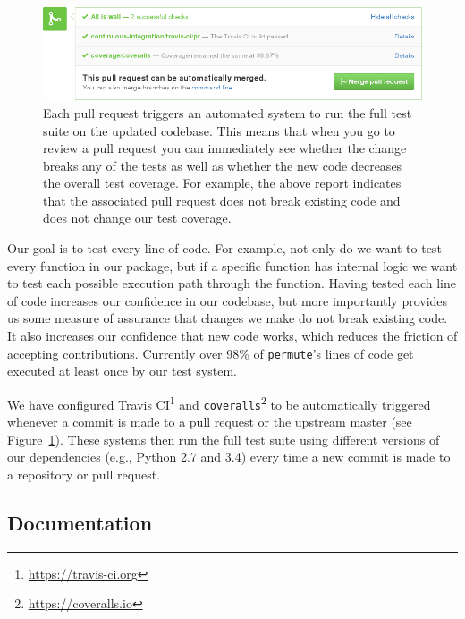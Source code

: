 \documentclass[]{article}
\begin{document}
\begin{figure}
  \begin{centering}
    \includegraphics[width=\textwidth]{pull-request-ci.png}\par
  \end{centering}

  \caption{\label{fig:pull-request}
  \small
    Each pull request triggers an automated system to run the  full test suite on
    the updated codebase.
    This means that when you go to review a pull request you can immediately see
    whether the change breaks any of the tests as well as whether the new
    code decreases the overall test coverage.
    For example, the above report indicates that the associated pull request does not
    break existing code and does not change our test coverage.}
\end{figure}

Our goal is to test every line of code.
For example, not only do we want to test every function in our package, but if
a specific function has internal logic we want to test each possible execution
path through the function.
Having tested each line of code increases our confidence in our codebase, but
more importantly provides us some measure of assurance that changes we make do
not break existing code.
It also increases our confidence that new code works, which reduces the
friction of accepting contributions.
Currently over 98\% of \texttt{permute}'s lines of code get executed at least
once by our test system.

We have configured Travis CI\footnote{\url{https://travis-ci.org}} and
\texttt{coveralls}\footnote{\url{https://coveralls.io}} to be automatically
triggered whenever a commit is made to a pull request or the upstream master
(see Figure~\ref{fig:pull-request}).
These systems then run the full test suite  using different versions of our
dependencies (e.g., Python 2.7 and 3.4) every time a new commit is made to a
repository or pull request.

\subsection{\label{sec:doc}Documentation}
\end{document}
